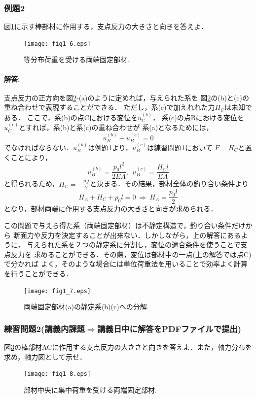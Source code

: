 \documentclass[10pt,a4j]{jarticle}
\begin{document}
\subsubsection{例題2}
図\ref{fig:fig1_6}に示す棒部材に作用する，支点反力の大きさと向きを答えよ．
\begin{figure}[h]
	\begin{center}
	\texttt{[image: fig1\_6.eps]} 
	\end{center}
	\caption{等分布荷重を受ける両端固定部材.} 
	\label{fig:fig1_6}
\end{figure}
\paragraph{解答:}
支点反力の正方向を図\ref{fig:fig1_7}-(a)のように定めれば，与えられた系を
図\ref{fig:fig1_7}の(b)と(c)の重ね合わせで表現することができる．
ただし，系(c)で加えれれた力$H_C$は未知である．
ここで，系(b)の点Cにおける変位を$u_C^{(b)}$，
系(c)の点Bにおける変位を$u_C^{(c)}$とすれば，系(b)と系(c)の重ね合わせが
系(a)となるためには，
\[
	u_B^{(b)}+u_B^{(c)}=0
\]
でなければならない．$u_B^{(b)}$は例題1より，$u_B^{(c)}$は練習問題1において
$\bar{F}=H_C$と置くことにより，
\[
	u_B^{(b)}=\frac{p_0l^2}{2EA}
	, \ \ 	
	u_B^{(c)}=\frac{H_Cl}{EA}
\]
と得られるため，$H_C=-\frac{p_0l}{2}$と決まる．その結果，部材全体の釣り合い条件より
\[
	H_A+H_C+p_0l=0 \ \Rightarrow \ H_A=\frac{p_0l}{2}
\]
となり，部材両端に作用する支点反力の大きさと向きが求められる．

この問題で与えら得た系（両端固定部材）は不静定構造で，釣り合い条件だけから
断面力や反力を決定することが出来ない．しかしながら，上の解答にあるように，
与えられた系を２つの静定系に分割し，変位の適合条件を使うことで支点反力を
求めることができる．その際，変位は部材中の一点(上の解答では点C)で分かれば
よく，そのような場合には単位荷重法を用いることで効率よく計算を行うことができる．
\begin{figure}[h]
	\begin{center}
	\texttt{[image: fig1\_7.eps]} 
	\end{center}
	\caption{両端固定部材(a)の静定系(b)(c)への分解.} 
	\label{fig:fig1_7}
\end{figure}
\subsubsection{練習問題2{\small (講義内課題$\Rightarrow$講義日中に解答をPDFファイルで提出)}}
図\ref{fig:fig1_8}の棒部材ACに作用する支点反力の大きさと向きを答えよ．また，軸力分布を求め，軸力図として示せ．
\begin{figure}[h]
	\begin{center}
	\texttt{[image: fig1\_8.eps]} 
	\end{center}
	\caption{部材中央に集中荷重を受ける両端固定部材.} 
	\label{fig:fig1_8}
\end{figure}
\end{document}
